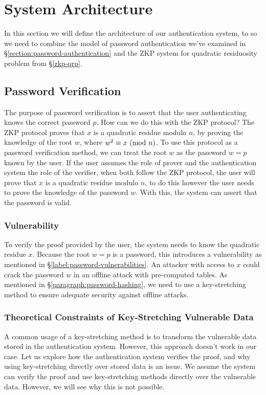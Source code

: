

\section{System Architecture}
\label{label:protocol-design}
In this section we will define the architecture of our authentication system, to so we need to combine the model of password authentication we've examined in \S\ref{section:password-authentication} and the ZKP system for quadratic residuosity problem from \S\ref{zkp-qrp}.

\subsection{Password Verification}
\label{section:zkp-password-verification}
The purpose of password verification is to assert that the user authenticating knows the correct password $p$. 
How can we do this with the ZKP protocol?
The ZKP protocol proves that $x$ is a quadratic residue modulo $n$, by proving the knowledge of the root $w$, where  $w^2 \equiv x \ (\mathrm{mod}\ n)$.
To use this protocol as a password verification method, we can treat the root $w$ as the password $w = p$ known by the user.
If the user assumes the role of prover and the authentication system the role of the verifier, when both follow the ZKP protocol, the user will prove that $x$ is a quadratic residue modulo $n$, to do this however the user needs to prove the knowledge of the password $w$. 
With this, the system can assert that the password is valid.

\subsubsection{Vulnerability}
To verify the proof provided by the user, the system needs to know the quadratic residue $x$.
Because the root $w = p$ is a password, this introduces a vulnerability as mentioned in \S\ref{label:password-vulnerabilities}.
An attacker with access to $x$ could crack the password $w$ in an offline attack with pre-computed tables.
As mentioned in \S\ref{paragraph:password-hashing}, we need to use a key-stretching method to ensure adequate security against offline attacks.

\subsubsection{Theoretical Constraints of Key-Stretching Vulnerable Data}
A common usage of a key-stretching method is to transform the vulnerable data stored in the authentication system.
However, this approach doesn't work in our case.
Let us explore how the authentication system verifies the proof, and why using key-stretching directly over stored data is an issue.
We assume the system can verify the proof and use key-stretching methods directly over the vulnerable data. 
However, we will see why this is not possible.

